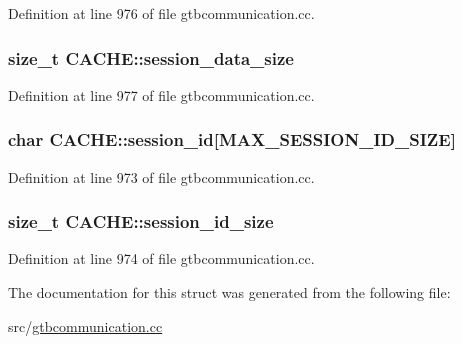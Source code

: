 Definition at line 976 of file gtbcommunication.\-cc.

\hypertarget{structCACHE_ab8dfd4baa14b034eaedad34115ad06f5}{
\subsubsection[{session\-\_\-data\-\_\-size}]{\setlength{\rightskip}{0pt plus 5cm}size\-\_\-t C\-A\-C\-H\-E\-::session\-\_\-data\-\_\-size}}\label{structCACHE_ab8dfd4baa14b034eaedad34115ad06f5}


Definition at line 977 of file gtbcommunication.\-cc.

\hypertarget{structCACHE_a546945d83f3c1401f06d1cfdf5107689}{
\subsubsection[{session\-\_\-id}]{\setlength{\rightskip}{0pt plus 5cm}char C\-A\-C\-H\-E\-::session\-\_\-id\mbox{[}{\bf M\-A\-X\-\_\-\-S\-E\-S\-S\-I\-O\-N\-\_\-\-I\-D\-\_\-\-S\-I\-Z\-E}\mbox{]}}}\label{structCACHE_a546945d83f3c1401f06d1cfdf5107689}


Definition at line 973 of file gtbcommunication.\-cc.

\hypertarget{structCACHE_ad06d74c3164389ccc45261443bafc460}{
\subsubsection[{session\-\_\-id\-\_\-size}]{\setlength{\rightskip}{0pt plus 5cm}size\-\_\-t C\-A\-C\-H\-E\-::session\-\_\-id\-\_\-size}}\label{structCACHE_ad06d74c3164389ccc45261443bafc460}


Definition at line 974 of file gtbcommunication.\-cc.



The documentation for this struct was generated from the following file\-:\begin{DoxyCompactItemize}
\item 
src/\hyperlink{gtbcommunication_8cc}{gtbcommunication.\-cc}\end{DoxyCompactItemize}
